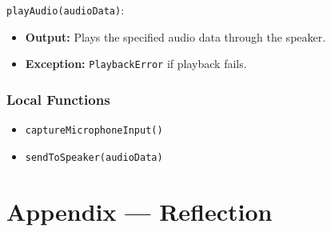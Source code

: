 \documentclass[12pt, titlepage]{article}
\begin{document}
\noindent \texttt{playAudio(audioData)}:
\begin{itemize}  
    \item \textbf{Output:} Plays the specified audio data through the speaker.  
    \item \textbf{Exception:} \texttt{PlaybackError} if playback fails.  
\end{itemize}  

\subsubsection{Local Functions}  
\begin{itemize}  
    \item \texttt{captureMicrophoneInput()}  
    \item \texttt{sendToSpeaker(audioData)}  
\end{itemize}  

\newpage




\newpage

\section*{Appendix --- Reflection}


\end{document}
